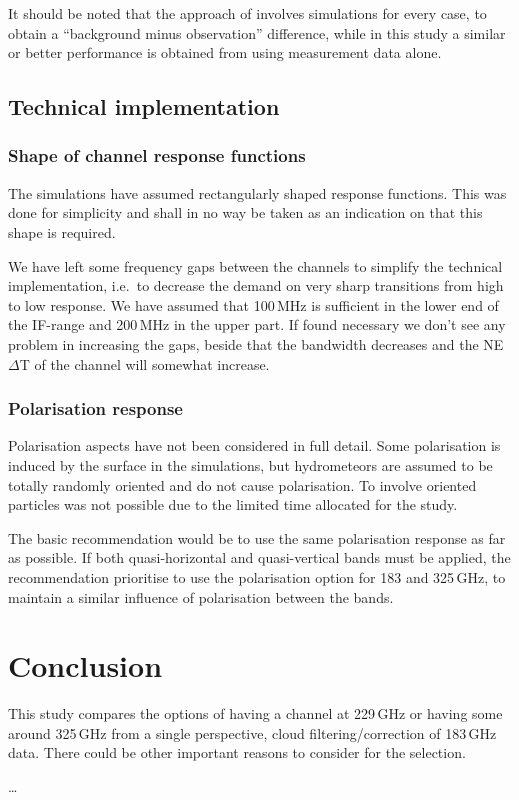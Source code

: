 \documentclass[12pt]{article}
\begin{document}
It should be noted that the approach of \citet{rekha2012potential} involves
simulations for every case, to obtain a ``background minus observation''
difference, while in this study a similar or better performance is obtained
from using measurement data alone. 


\subsection{Technical implementation}

\subsubsection{Shape of channel response functions}
%
The simulations have assumed rectangularly shaped response functions. This was
done for simplicity and shall in no way be taken as an indication on that this
shape is required.

We have left some frequency gaps between the channels to simplify the technical
implementation, i.e.\ to decrease the demand on very sharp transitions from high
to low response. We have assumed that 100\,MHz is sufficient in the lower end
of the IF-range and 200\,MHz in the upper part. If found necessary we don't see
any problem in increasing the gaps, beside that the bandwidth decreases and the
NE$\Delta$T of the channel will somewhat increase.


\subsubsection{Polarisation response}
%
Polarisation aspects have not been considered in full detail. Some polarisation
is induced by the surface in the simulations, but hydrometeors are assumed to
be totally randomly oriented and do not cause polarisation. To involve oriented
particles was not possible due to the limited time allocated for the study.

The basic recommendation would be to use the same polarisation response as far
as possible. If both quasi-horizontal and quasi-vertical bands must be applied,
the recommendation prioritise to use the polarisation option for 183 and
325\,GHz, to maintain a similar influence of polarisation between the bands.







\section{Conclusion}
%
This study compares the options of having a channel at 229\,GHz or having some
around 325\,GHz from a single perspective, cloud filtering/correction of
183\,GHz data. There could be other important reasons to consider for the
selection.

\dots


{\footnotesize

}
\end{document}
